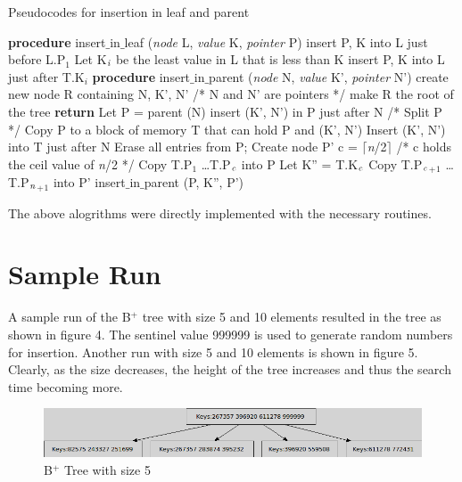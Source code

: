 \documentclass[11pt, oneside, a4paper]{article}
\begin{document}
\begin{algorithm}
\caption{Pseudocodes for insertion in leaf and parent}
\label{alg3}
\begin{algorithmic}[1]
\STATE \textbf{procedure} insert$\_$in$\_$leaf (\emph{node} L, \emph{value} K, \emph{pointer} P)
\STATE insert P, K into L just before L.P$_1$
\ELSE
\STATE Let K$_\emph{i}$ be the least value in L that is less than K
\STATE insert P, K into L just after T.K$_i$
\ENDIF
\STATE
\STATE \textbf{procedure} insert$\_$in$\_$parent (\emph{node} N, \emph{value} K', \emph{pointer} N')
\STATE create new node R containing N, K', N' /* N and N' are pointers */
\STATE make R the root of the tree
\STATE \textbf{return}
\ENDIF
\STATE Let P = parent (N)
\STATE insert (K', N') in P just after N
\ELSE
\STATE /* Split P */
\STATE Copy P to a block of memory T that can hold P and (K', N')
\STATE Insert (K', N') into T just after N
\STATE Erase all entries from P; Create node P'
\STATE c = $\lceil$\emph{n}/2$\rceil$  /* c holds the ceil value of \emph{n}/2 */
\STATE Copy T.P$_1$ \ldots T.P$_\emph{c}$ into P
\STATE Let K'' = T.K$_\emph{c}$
\STATE Copy T.P$_\emph{c}$$_+$$_1$ \ldots T.P$_\emph{n}$$_+$$_1$ into P'
\STATE insert$\_$in$\_$parent (P, K'', P')
\ENDIF
\end{algorithmic}
\end{algorithm}

The above alogrithms were directly implemented with the necessary routines.

\section{Sample Run}
A sample run of the B$^+$ tree with size 5 and 10 elements resulted in the tree as shown in figure 4.  The sentinel value 999999 is used to generate random numbers for insertion.  Another run with size 5 and 10 elements is shown in figure 5.  Clearly, as the size decreases, the height of the tree increases and thus the search time becoming more.

\begin{figure}[htb]
\begin{center}
\ifpdf
	\includegraphics[scale=0.40]{./bplusSize5.png}
\else
\fi
\caption{B$^+$ Tree with size 5}
\label{fig:4}
\end{center}
\end{figure}
\end{document}
